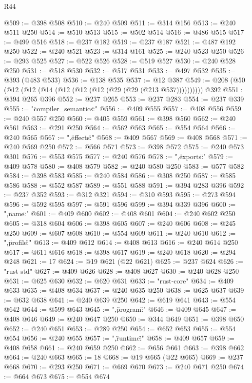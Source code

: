 \begin{lexlean}{R44}
\begin{coremodule}
@509 := @398 @508
@510 := @240 @509
@511 := @314 @156
@513 := @240 @511 @250
@514 := @510 @513
@515 := @502 @514
@516 := @486 @515
@517 := @499 @516
@518 := @237 @182
@519 := @237 @187
@521 := @487 @192 @250
@522 := @240 @521
@523 := @314 @161
@525 := @240 @523 @250
@526 := @293 @525
@527 := @522 @526
@528 := @519 @527
@530 := @240 @528 @250
@531 := @518 @530
@532 := @517 @531
@533 := @497 @532
@535 := @393 (@483 @533)
@536 := @138 @535
@537 := @12 @387
@549 := @208 (@50 (@12 (@12 (@14 (@12 (@12 (@12 (@29 (@29 (@213 @537)))))))))) @392
@551 := @394 @265 @396
@552 := @237 @265
@553 := @237 @283
@554 := @237 @339
@555 := "{\"compiler_semantics\":"
@556 := @409 @555
@557 := @408 @556
@559 := @240 @557 @250
@560 := @405 @559
@561 := @398 @560
@562 := @240 @561
@563 := @291 @250
@564 := @562 @563
@565 := @554 @564
@566 := @240 @565
@567 := ",\"effects\":"
@568 := @409 @567
@569 := @408 @568
@571 := @240 @569 @250
@572 := @566 @571
@573 := @398 @572
@575 := @240 @573 @301
@576 := @553 @575
@577 := @240 @576
@578 := ",\"exports\":"
@579 := @409 @578
@580 := @408 @579
@582 := @240 @580 @250
@583 := @577 @582
@584 := @398 @583
@585 := @240 @584
@586 := @308 @250
@587 := @585 @586
@588 := @552 @587
@589 := @551 @588
@591 := @394 @283 @396
@592 := @237 @352
@593 := @312 @321
@594 := @310 @593
@595 := @273 @594
@596 := @592 @595
@597 := @591 @596
@599 := @394 @339 @396
@600 := ",\"name\":"
@601 := @409 @600
@602 := @408 @601
@604 := @240 @602 @250
@605 := @318 @604
@606 := @398 @605
@607 := @240 @606
@608 := @245 @250
@609 := @607 @608
@610 := @554 @609
@611 := @240 @610
@612 := ",\"profile\":"
@613 := @409 @612
@614 := @408 @613
@616 := @240 @614 @250
@617 := @611 @616
@618 := @398 @617
@619 := @240 @618
@620 := @294 @248
@621 := 17
@624 := @19 @621 (@22 @621)
@625 := @237 @624
@626 := "rust-std"
@627 := @409 @626
@628 := @408 @627
@630 := @240 @628 @250
@631 := @625 @630
@632 := @620 @631
@633 := "rust-core"
@634 := @409 @633
@635 := @408 @634
@637 := @240 @635 @250
@638 := @625 @637
@639 := @632 @638
@641 := @240 @639 @250
@642 := @619 @641
@643 := @554 @642
@644 := @599 @643
@645 := ",\"program\":"
@646 := @409 @645
@647 := @408 @646
@649 := @240 @647 @250
@650 := @344 @649
@651 := @398 @650
@652 := @240 @651
@653 := @289 @250
@654 := @652 @653
@655 := @554 @654
@656 := @240 @655
@657 := ",\"runtime\":"
@658 := @409 @657
@659 := @408 @658
@661 := @240 @659 @250
@662 := @656 @661
@663 := @398 @662
@664 := @240 @663
@665 := 18
@668 := @19 @665 (@22 @665)
@669 := @237 @668
@670 := @293 @250
@671 := @669 @670
@673 := @240 @671 @250
@674 := @664 @673
@675 := @554 @674
}
\end{coremodule}
\end{lexlean}
